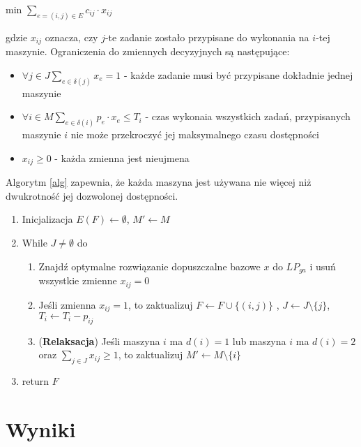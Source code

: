 \documentclass[12pt, a4paper]{article}
\begin{document}
\begin{center}
	min \textbf{$\displaystyle\sum_{e=(i,j) \in E} c_{ij} \cdot x_{ij}$}
\end{center}
gdzie $x_{ij}$ oznacza, czy $j$-te zadanie zostało przypisane do wykonania
na $i$-tej maszynie.
Ograniczenia do zmiennych decyzyjnych są następujące:

\begin{itemize}
  \item $\forall{j \in J} \displaystyle\sum_{e \in \delta(j)} x_e = 1$ - każde zadanie musi być przypisane dokładnie jednej maszynie
  \item $\forall{i \in M} \displaystyle\sum_{e \in \delta(i)} p_e \cdot x_e \leq T_i$ - czas wykonaia wszystkich zadań, przypisanych maszynie $i$ nie może
przekroczyć jej maksymalnego czasu dostępności
  \item $x_{ij} \geq 0$ - każda zmienna jest nieujmena
\end{itemize}

Algorytm \ref{alg} zapewnia, że każda maszyna jest używana
nie więcej niż dwukrotność jej dozwolonej dostępności.

\begin{algorithm}
\caption{}\label{alg}
\begin{enumerate}
  \item Inicjalizacja $E(F) \gets \emptyset$, $M' \gets M$ 
  \item While $J \neq \emptyset$ do
  \begin{enumerate}
    \item Znajdź optymalne rozwiązanie dopuszczalne bazowe $x$ do $LP_{ga}$
    i usuń wszystkie zmienne $x_{ij} = 0$
    \item Jeśli zmienna $x_{ij} = 1$, to zaktualizuj $F \gets F \cup \{(i, j)\}$
    , $J \gets J \setminus \{j\}$, $T_i \gets T_i - p_{ij}$
    \item (\textbf{Relaksacja}) Jeśli maszyna $i$ ma $d(i) = 1$ lub maszyna
    $i$ ma $d(i) = 2$ oraz $\displaystyle\sum_{j \in J} x_{ij} \geq 1$, to zaktualizuj $M' \gets M \setminus \{i\}$
  \end{enumerate}
  \item return $F$
\end{enumerate}
\end{algorithm}

\section*{Wyniki}
\end{document}
